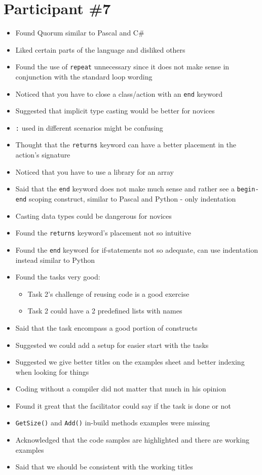 \section{Participant {\#}7}
\begin{itemize}
\item Found Quorum similar to Pascal and C\#
\item Liked certain parts of the language and disliked others
\item Found the use of \lstinline!repeat! unnecessary since it does not make sense in conjunction with the standard loop wording
\item Noticed that you have to close a class/action with an \lstinline!end! keyword
\item Suggested that implicit type casting would be better for novices
\item \lstinline!:! used in different scenarios might be confusing
\item Thought that the \lstinline!returns! keyword can have a better placement in the action’s signature
\item Noticed that you have to use a library for an array
\item Said that the \lstinline!end! keyword does not make much sense and rather see a \lstinline!begin-end! scoping construct, similar to Pascal and Python - only indentation
\item Casting data types could be dangerous for novices
\item Found the \lstinline!returns! keyword’s placement not so intuitive 
\item Found the \lstinline!end! keyword for if-statements not so adequate, can use indentation instead similar to Python
\item Found the tasks very good:
	\begin{itemize}
		\item Task 2’s challenge of reusing code is a good exercise 
		\item Task 2 could have a 2 predefined lists with names
	\end{itemize}
\item Said that the task encompass a good portion of constructs 
\item Suggested we could add a setup for easier start with the tasks
\item Suggested we give better titles on the examples sheet and better indexing when looking for things
\item Coding without a compiler did not matter that much in his opinion
\item Found it great that the facilitator could say if the task is done or not
\item \lstinline!GetSize()! and \lstinline!Add()! in-build methods examples were missing
\item Acknowledged that the code samples are highlighted and there are working examples
\item Said that we should be consistent with the working titles
\end{itemize}

